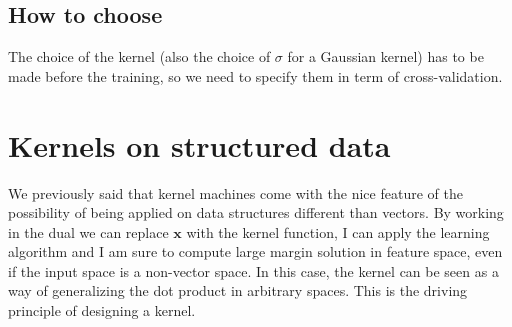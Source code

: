 \subsection{How to choose}
The choice of the kernel (also the choice of $\sigma$ for a Gaussian kernel) has
to be made before the training, so we need to specify them in term of cross-validation.

\section{Kernels on structured data}
We previously said that kernel machines come with the nice feature of the possibility
of being applied on data structures different than vectors. By working in the
dual we can replace $\pmb{x}$ with the kernel function, I can apply the learning
algorithm and I am sure to compute large margin solution in feature space, even
if the input space is a non-vector space. In this case, the kernel can be seen
as a way of generalizing the dot product in arbitrary spaces. This is the driving
principle of designing a kernel.\\

